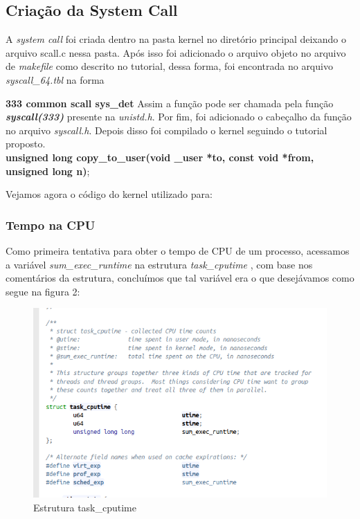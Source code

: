 \documentclass[12pt]{article}
\begin{document}
\subsection{Criação da System Call}
A \textit{system call} foi criada dentro na pasta kernel no diretório principal deixando o arquivo  scall.c nessa pasta. Após isso foi adicionado o arquivo objeto no arquivo de \textit{makefile} como descrito no tutorial, dessa forma, foi encontrada no arquivo \textit{syscall\_64.tbl} na forma\cite{rubini2001linux} \newline

\textbf{333	common	scall			sys\_det}
\newline
Assim a função pode ser chamada pela função \textit{\textbf{syscall(333)}} presente na \textit{unistd.h}. Por fim, foi adicionado o cabeçalho da função no arquivo \textit{syscall.h}. Depois disso foi compilado o kernel seguindo o tutorial proposto\cite{scall}. 
\\ \newline
\scriptsize{\textbf{unsigned long copy\_to\_user(void \_user *to, const void *from, unsigned long n)};}
\newline
\normalsize
	
Vejamos agora o código do kernel utilizado para:

\subsubsection{Tempo na CPU}
	Como primeira tentativa para obter o tempo de CPU de um processo, acessamos a variável \textit{sum\_exec\_runtime} na estrutura \textit{task\_cputime} \cite{freeelc}, com base nos comentários da estrutura, concluímos que tal variável era o que desejávamos como segue na figura 2: %

\begin{figure}[!htb]
	\centering
	\includegraphics[scale=0.5]{imagens/img1.png}
	\caption{Estrutura task\_cputime}
	\label{taskcputime}
\end{figure}
\end{document}
